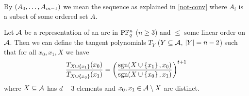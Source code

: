 \begin{convention}
    By $\seq{\range{A_0}{A_{m-1}}}$ we mean the sequence as explained in \autoref{not-conv} where $A_i$ is a subset of some ordered set $A$.%
\end{convention}


\begin{corollary}\label{mds-segre-simplified}
    Let $\mathcal{A}$ be a representation of an arc in $\P \field{q}^n$ ($n\geq 3$) and $\leq$ some linear
    order on $\mathcal{A}$. Then we can define the tangent polynomials $T_Y$
    ($Y\subseteq \mathcal{A}$, $\left\vert{Y}\right\vert=n-2$) such that for all $x_0,x_1,X$ we have
    $$    \frac{T_{X\setjoin\set{x_1}}(x_0)}{T_{X\setjoin\set{x_0}}(x_1)}={\left(\frac{\sgn(X\setjoin\set{x_1},x_0)}{\sgn(X\setjoin\set{x_0},x_1)}\right)}^{t+1}
    $$
    where $X\subseteq \mathcal{A}$ has $d-3$ elements and $x_0,x_1\in \mathcal{A}\setminus X$ are distinct.
\end{corollary}

